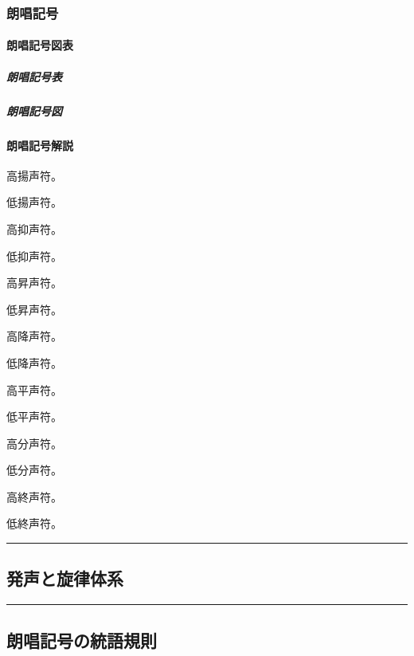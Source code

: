 \documentclass[
  japanese,
]{article}
\providecommand{\tightlist}{%
  \setlength{\itemsep}{0pt}\setlength{\parskip}{0pt}}
\begin{document}
\subsubsection{朗唱記号}\label{section3.1}

\paragraph{朗唱記号図表}\label{subsection3.1.1}

\subparagraph{朗唱記号表}\label{subsubsection3.1.1.1}

\subparagraph{朗唱記号図}\label{subsubsection3.1.1.2}

\paragraph{朗唱記号解説}\label{subsection3.1.2}

\begin{description}
\tightlist
\item[{◌́}]
高揚声符。
\item[{◌̗}]
低揚声符。
\item[{◌̀}]
高抑声符。
\item[{◌̖}]
低抑声符。
\item[{◌̂}]
高昇声符。
\item[{◌̭}]
低昇声符。
\item[{◌̌}]
高降声符。
\item[{◌̬}]
低降声符。
\item[{◌̄}]
高平声符。
\item[{◌̱}]
低平声符。
\item[{◌̈}]
高分声符。
\item[{◌̤}]
低分声符。
\item[{◌̇}]
高終声符。
\item[{◌̣}]
低終声符。
\end{description}

\begin{center}\rule{0.5\linewidth}{0.5pt}\end{center}

\subsection{発声と旋律体系}\label{chapter4}

\begin{center}\rule{0.5\linewidth}{0.5pt}\end{center}

\subsection{朗唱記号の統語規則}\label{chapter5}
\end{document}
